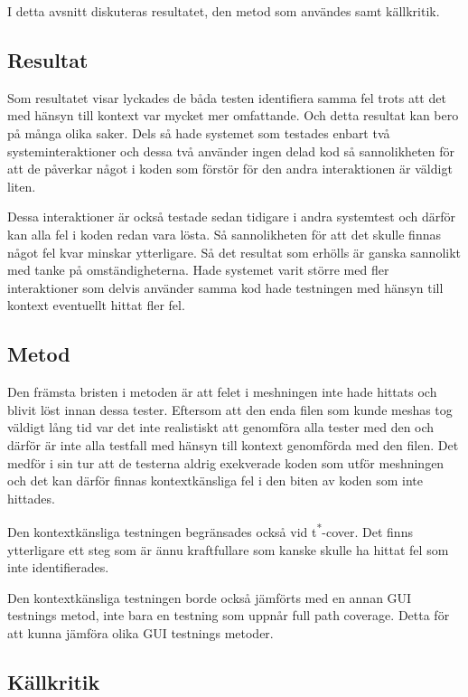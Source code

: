 I detta avsnitt diskuteras resultatet, den metod som användes samt källkritik.

\subsection{Resultat}

Som resultatet visar lyckades de båda testen identifiera samma fel trots att det med hänsyn till kontext var mycket mer omfattande. Och detta resultat kan bero på många olika saker. Dels så hade systemet som testades enbart två systeminteraktioner och dessa två använder ingen delad kod så sannolikheten för att de påverkar något i koden som förstör för den andra interaktionen är väldigt liten.

Dessa interaktioner är också testade sedan tidigare i andra systemtest och därför kan alla fel i koden redan vara lösta. Så sannolikheten för att det skulle finnas något fel kvar minskar ytterligare. Så det resultat som erhölls är ganska sannolikt med tanke på omständigheterna. Hade systemet varit större med fler interaktioner som delvis använder samma kod hade testningen med hänsyn till kontext eventuellt hittat fler fel.

\subsection{Metod}

Den främsta bristen i metoden är att felet i meshningen inte hade hittats och blivit löst innan dessa tester. Eftersom att den enda filen som kunde meshas tog väldigt lång tid var det inte realistiskt att genomföra alla tester med den och därför är inte alla testfall med hänsyn till kontext genomförda med den filen. Det medför i sin tur att de testerna aldrig exekverade koden som utför meshningen och det kan därför finnas kontextkänsliga fel i den biten av koden som inte hittades.

Den kontextkänsliga testningen begränsades också vid t\textsuperscript{*}-cover. Det finns ytterligare ett steg som är ännu kraftfullare som kanske skulle ha hittat fel som inte identifierades.

Den kontextkänsliga testningen borde också jämförts med en annan GUI testnings metod, inte bara en testning som uppnår full path coverage. Detta för att kunna jämföra olika GUI testnings metoder.

\subsection{Källkritik}

